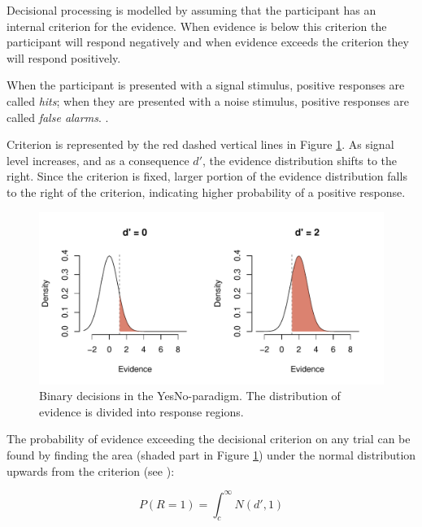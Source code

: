 \documentclass{article}\usepackage{knitr}
\begin{document}
Decisional processing is modelled by assuming that the participant has an internal criterion for the evidence. When evidence is below this criterion the participant will respond negatively and when evidence exceeds the criterion they will respond  positively.

When the participant is presented with a signal stimulus, positive responses are called \textit{hits}; when they  are presented with a noise stimulus, positive responses are called \textit{false alarms}. \citep{wickens2002, kingdomprins2010}. 

Criterion is represented by the red dashed vertical lines in Figure \ref{fig:yesno}. As signal level increases, and as a consequence $d'$, the evidence distribution shifts to the right. Since the criterion is fixed, larger portion of the evidence distribution falls to the right of the criterion, indicating higher probability of a positive response.

\begin{figure}[!htb]
\centering
\begin{knitrout}
\color{fgcolor}
\includegraphics[width=\maxwidth]{figure/unnamed-chunk-4-1} 

\end{knitrout}
\caption{Binary decisions in the YesNo-paradigm. The distribution of evidence is divided into response regions.}
\label{fig:yesno}
\end{figure}

The probability of evidence exceeding the decisional criterion on any trial can be found by finding the area (shaded part in Figure \ref{fig:yesno}) under the normal distribution upwards from the criterion (see \citet{wickens2002, kingdomprins2010}):

\begin{equation}
\label{eq:SDTintegral}
P(R = 1) = \int_{c}^{\infty} N(d', 1)
\end{equation}
\end{document}
